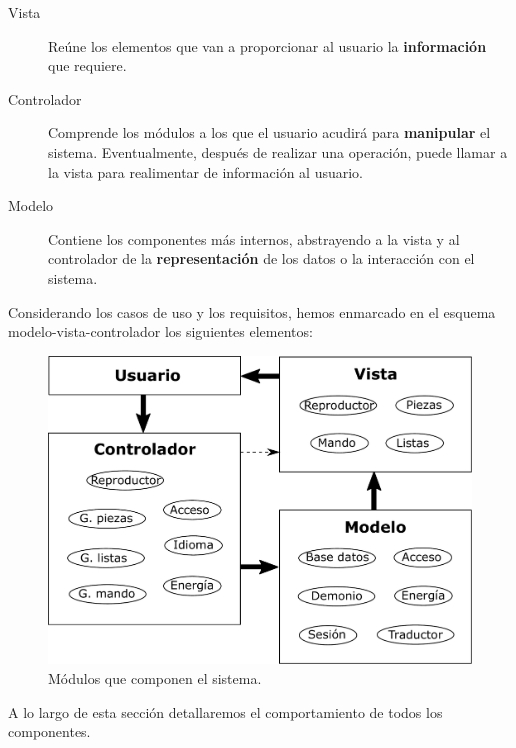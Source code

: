 \smallskip

\begin{description}
	\item[Vista] Reúne los elementos que van a proporcionar al usuario la \textbf{información} que requiere.
	\item[Controlador] Comprende los módulos a los que el usuario acudirá para \textbf{manipular} el sistema. Eventualmente, después de realizar una operación, puede llamar a la vista para realimentar de información al usuario. 
	\item[Modelo] Contiene los componentes más internos, abstrayendo a la vista y al controlador de la \textbf{representación} de los datos o la interacción con el sistema.
\end{description}

Considerando los casos de uso y los requisitos, hemos enmarcado en el esquema modelo-vista-controlador los siguientes elementos:

\smallskip

\begin{figure}[H]
	\noindent \begin{centering}
		\includegraphics[width=\linewidth*2/3]{capitulo4/mvc_completo}
		\par\end{centering}
	\smallskip
	\caption{\label{fig:mvc_completo} Módulos que componen el sistema.}
\end{figure} 

\smallskip

A lo largo de esta sección detallaremos el comportamiento de todos los componentes.

